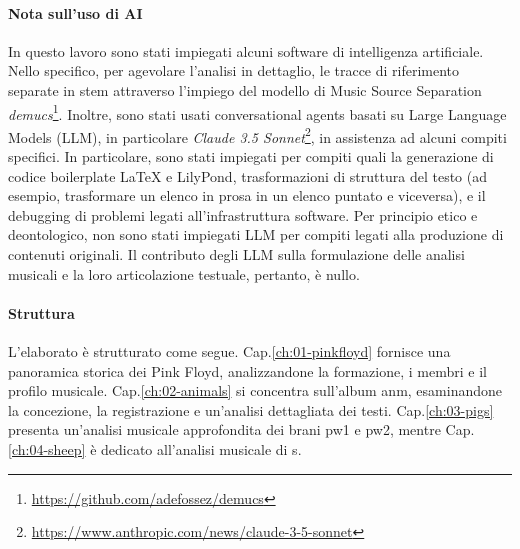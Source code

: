 \documentclass[class=book, crop=false, oneside, 12pt]{standalone}
\begin{document}
\paragraph{Nota sull'uso di AI}
In questo lavoro sono stati impiegati alcuni software di intelligenza artificiale. Nello specifico, per agevolare l'analisi in dettaglio, le tracce di riferimento separate in stem attraverso l'impiego del modello di Music Source Separation \emph{demucs}\footnote{\url{https://github.com/adefossez/demucs}}. Inoltre, sono stati usati conversational agents basati su Large Language Models (LLM), in particolare \emph{Claude 3.5 Sonnet}\footnote{\url{https://www.anthropic.com/news/claude-3-5-sonnet}}, in assistenza ad alcuni compiti specifici. In particolare, sono stati impiegati per compiti quali la generazione di codice boilerplate LaTeX e LilyPond, trasformazioni di struttura del testo (ad esempio, trasformare un elenco in prosa in un elenco puntato e viceversa), e il debugging di problemi legati all'infrastruttura software. Per principio etico e deontologico, non sono stati impiegati LLM per compiti legati alla produzione di contenuti originali. Il contributo degli LLM sulla formulazione delle analisi musicali e la loro articolazione testuale, pertanto, è nullo.

\paragraph{Struttura}
L'elaborato è strutturato come segue. Cap.\ref{ch:01-pinkfloyd} fornisce una panoramica storica dei Pink Floyd, analizzandone la formazione, i membri e il profilo musicale. Cap.\ref{ch:02-animals} si concentra sull'album \acrlong{anm}, esaminandone la concezione, la registrazione e un'analisi dettagliata dei testi. Cap.\ref{ch:03-pigs} presenta un'analisi musicale approfondita dei brani \acrlong{pw1} e \acrlong{pw2}, mentre Cap.\ref{ch:04-sheep} è dedicato all'analisi musicale di \acrlong{s}.
\end{document}
